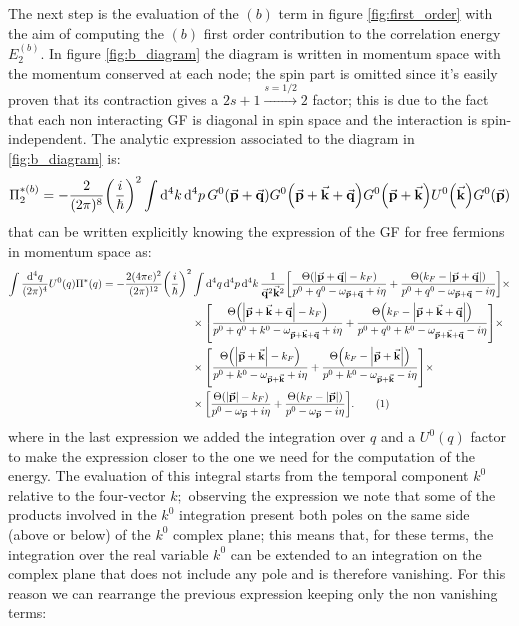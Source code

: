 \documentclass[a4paper]{article}
\newcommand{\numberthis}{\addtocounter{equation}{1}\tag{\theequation}}
\newcommand{\Ta}{\Theta\pqty{\abs{\va{p}+\va{q}}-k_F}}
\newcommand{\Taa}{\Theta\pqty{k_F - \abs{\va{p}+\va{q}}}}
\newcommand{\Tb}{\Theta\pqty{\abs{\va{p} + \va{k} + \va{q}}-k_F}}
\newcommand{\Tbb}{\Theta\pqty{k_F - \abs{\va{p} + \va{k} + \va{q}}}}
\newcommand{\Tc}{\Theta\pqty{\abs{\va{p}+\va{k}}-k_F}}
\newcommand{\Tcc}{\Theta\pqty{k_F -\abs{\va{p}+\va{k}}}}
\newcommand{\Td}{\Theta\pqty{\abs{\va{p}}-k_F}}
\newcommand{\Tdd}{\Theta\pqty{k_F -\abs{\va{p}}}}
\begin{document}
The next step is the evaluation of the $(b)$ term in figure \ref{fig:first_order} with the aim of computing the $(b)$ first order contribution to the correlation energy $E_2^(b).$
In figure \ref{fig:b_diagram} the diagram is written in momentum space with the momentum conserved at each node; the spin part is omitted since it's easily proven that its contraction gives a $2s+1 \overset{s=1/2}{\rightarrow} 2 $ factor; this is due to the fact that each non interacting GF is diagonal in spin space and the interaction is spin-independent.
The analytic expression associated to the diagram in \eqref{fig:b_diagram} is:
\begin{align*}
\Pi^{*(b)}_2 = -\frac{2}{(2\pi)^8}\pqty{\frac{i}{\hbar}}^2\int\dd[4]{k}\dd[4]{p}G^0\pqty{\va{p}+\va{q}}G^0\pqty{\va{p}+\va{k}+\va{q}}G^0\pqty{\va{p}+\va{k}}U^0\pqty{\va{k}}G^0\pqty{\va{p}}
\end{align*}
that can be written explicitly knowing the expression of the GF for free fermions in momentum space as:
\begin{align*}
\int \frac{\dd[4]{q}}{(2\pi)^4}U^0(q)\Pi^*(q) = -\frac{2(4\pi e)^2}{(2\pi)^{12}} \pqty{\frac{i}{\hbar}}^2 &\int \dd[4]{q}\dd[4]{p}\dd[4]{k}\frac{1}{\va{q}^2 \va{k}^2}
\bqty{\frac{\Ta}{p^0 +q^0 -\omega_{\va{p} + \va{q}} + i\eta} + \frac{\Taa}{p^0+q^0 -\omega_{\va{p}+\va{q}}-i\eta}}\times\\
&\times \bqty{\frac{\Tb}{p^0+q^0+k^0 - \omega_{\va{p}+\va{k}+\va{q}}+i\eta} + \frac{\Tbb}{p^0+q^0+k^0 - \omega_{\va{p}+\va{k}+\va{q}}-i\eta} }\times\\
&\times \bqty{\frac{\Tc}{p^0+k^0 - \omega_{\va{p}+\va{k}}+i\eta} + \frac{\Tcc}{p^0+k^0 - \omega_{\va{p}+\va{k}}-i\eta} }\times\\
&\times \bqty{\frac{\Td}{p^0 - \omega_{\va{p}}+i\eta} + \frac{\Tdd}{p^0 - \omega_{\va{p}}-i\eta} }.\numberthis 
\end{align*}
where in the last expression we added the integration over $q$ and a $U^0(q)$ factor to make the expression closer to the one we need for the computation of the energy.
The evaluation of this integral starts from the temporal component $k^0$ relative to the four-vector $k;$ observing the expression we note that some of the products involved in the $k^0$ integration present both poles on the same side (above or below) of the $k^0$ complex plane; this means that, for these terms, the integration over the real variable $k^0$ can be extended to an integration on the complex plane that does not include any pole and is therefore vanishing.
For this reason we can rearrange the previous expression keeping only the non vanishing terms:
\end{document}
